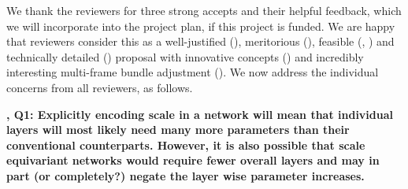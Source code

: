 \documentclass[12pt]{article}
\date{} %
\newcommand{\revOne}{{\color{red}{R1}}}
\newcommand{\revTwo}{{\color{orange}{R2}}}
\newcommand{\revThree}{{\color{my_magenta}{R3}}}
\newcommand{\revFour}{{\color{my_blue}{R4}}}
\begin{document}
\renewcommand*{\thepage}{Page \arabic{page}}


We thank the reviewers for three strong accepts and their helpful feedback, which we will incorporate into the project plan, if this project is funded. We are happy that reviewers consider this as a well-justified (\revTwo), meritorious (\revFour), feasible (\revThree, \revFour) and technically detailed (\revFour) proposal with innovative concepts (\revFour) and incredibly interesting multi-frame \twoD  bundle adjustment (\revOne). 
We now address the individual concerns from all reviewers, as follows.


    \textbf{\revOne, Q1: Explicitly encoding scale in a network will mean that individual layers will most likely need many more parameters than their conventional counterparts. However, it is also possible that scale equivariant networks would require fewer overall layers and may in part (or completely?) negate the
layer wise parameter increases.}
\end{document}
